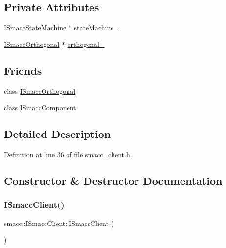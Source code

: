 \subsection*{Private Attributes}
\begin{DoxyCompactItemize}
\item 
\hyperlink{classsmacc_1_1ISmaccStateMachine}{I\+Smacc\+State\+Machine} $\ast$ \hyperlink{classsmacc_1_1ISmaccClient_a926e4f2ae796def63d48dca389a48c47}{state\+Machine\+\_\+}
\item 
\hyperlink{classsmacc_1_1ISmaccOrthogonal}{I\+Smacc\+Orthogonal} $\ast$ \hyperlink{classsmacc_1_1ISmaccClient_a571c7f672d9c90128b5498aefc27c136}{orthogonal\+\_\+}
\end{DoxyCompactItemize}
\subsection*{Friends}
\begin{DoxyCompactItemize}
\item 
class \hyperlink{classsmacc_1_1ISmaccClient_a7205cc84a71fea903124d54d01e99a68}{I\+Smacc\+Orthogonal}
\item 
class \hyperlink{classsmacc_1_1ISmaccClient_a6353147888486d8c9d5d1fae476c1efe}{I\+Smacc\+Component}
\end{DoxyCompactItemize}


\subsection{Detailed Description}


Definition at line 36 of file smacc\+\_\+client.\+h.



\subsection{Constructor \& Destructor Documentation}
\mbox{\label{classsmacc_1_1ISmaccClient_a40222ad8b9b7962755434025b1fd5ae7}} 
\subsubsection{\texorpdfstring{I\+Smacc\+Client()}{ISmaccClient()}}
{\footnotesize\ttfamily smacc\+::\+I\+Smacc\+Client\+::\+I\+Smacc\+Client (\begin{DoxyParamCaption}{ }\end{DoxyParamCaption})}



